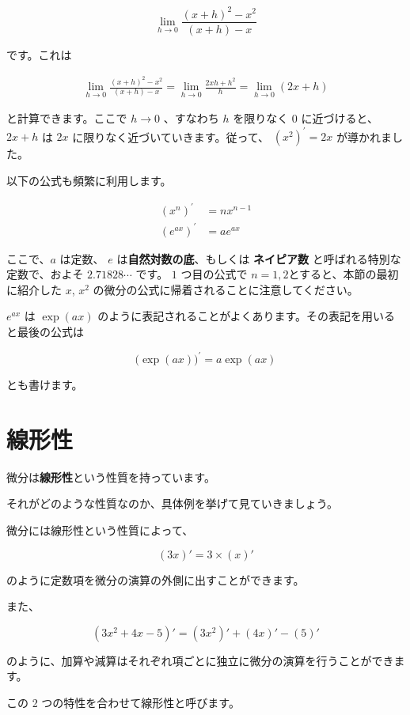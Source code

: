 \[
\displaystyle \lim _{h\to 0} \frac{(x+h)^2 - x^2}{(x+h) - x}
\]

です。これは


\begin{align}
\lim _{h\to 0} \frac{(x+h)^2 - x^2}{(x+h) - x} = \lim _{h\to 0} \frac{2xh + h^2}{h} = \lim _{h\to 0} (2x + h)
\end{align}


と計算できます。ここで $h\to 0$ 、すなわち $h$ を限りなく $0$ に近づけると、 $2x + h$ は $2x$ に限りなく近づいていきます。従って、 $\left( x^{2}\right)^{'} = 2x$ が導かれました。


以下の公式も頻繁に利用します。


\begin{align}
\left( x^{n} \right)^{'} &= nx^{n-1} \\
\left( e^{ax} \right)^{'} &= ae^{ax}
\end{align}


ここで、$a$ は定数、 $e$ は\textbf{自然対数の底}、もしくは \textbf{ネイピア数} と呼ばれる特別な定数で、およそ $2.71828\cdots$ です。 $1$ つ目の公式で $n=1, 2$とすると、本節の最初に紹介した $x$, $x^2$ の微分の公式に帰着されることに注意してください。

$e^{ax}$ は $\exp(ax)$ のように表記されることがよくあります。その表記を用いると最後の公式は


\[
\bigl( \exp(ax) \bigr)^{'} = a\exp(ax)
\]


とも書けます。


\section{線形性}


微分は\textbf{線形性}という性質を持っています。

それがどのような性質なのか、具体例を挙げて見ていきましょう。

微分には線形性という性質によって、


\[
(3x)' = 3 \times (x)'
\]


のように定数項を微分の演算の外側に出すことができます。

また、


\[
\left( 3x^{2} + 4x - 5 \right)' = \left( 3x^{2} \right)' + \left( 4x \right)' - \left( 5 \right)'
\]


のように、加算や減算はそれぞれ項ごとに独立に微分の演算を行うことができます。

この 2 つの特性を合わせて線形性と呼びます。



